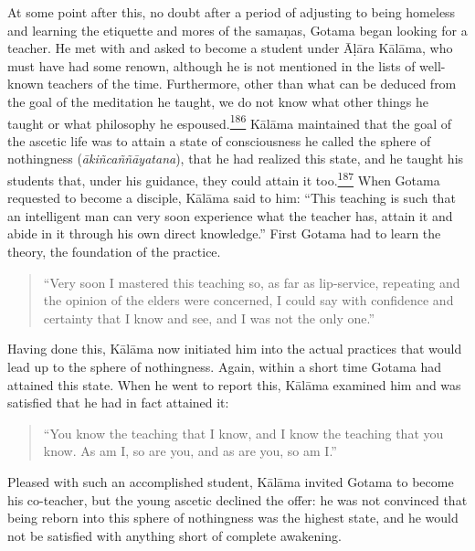 At some point after this, no doubt after a period of adjusting to being
homeless and learning the etiquette and mores of the samaṇas, Gotama
began looking for a teacher. He met with and asked to become a student
under Āḷāra Kālāma, who must have had some renown, although he is not
mentioned in the lists of well-known teachers of the time. Furthermore,
other than what can be deduced from the goal of the meditation he
taught, we do not know what other things he taught or what philosophy he
espoused.\label{footprints_split_009.html_fnref186}\hyperref[footprints_split_024.htmlux5cux23fn186]{\textsuperscript{186}}
Kālāma maintained that the goal of the ascetic life was to attain a
state of consciousness he called the sphere of nothingness
(\emph{ākiñcaññāyatana}), that he had realized this state, and he taught
his students that, under his guidance, they could attain it
too.\label{footprints_split_009.html_fnref187}\hyperref[footprints_split_024.htmlux5cux23fn187]{\textsuperscript{187}}
When Gotama requested to become a disciple, Kālāma said to him: ``This
teaching is such that an intelligent man can very soon experience what
the teacher has, attain it and abide in it through his own direct
knowledge.'' First Gotama had to learn the theory, the foundation of the
practice.

\begin{quote}
``Very soon I mastered this teaching so, as far as lip-service,
repeating and the opinion of the elders were concerned, I could say with
confidence and certainty that I know and see, and I was not the only
one.''
\end{quote}

Having done this, Kālāma now initiated him into the actual practices
that would lead up to the sphere of nothingness. Again, within a short
time Gotama had attained this state. When he went to report this, Kālāma
examined him and was satisfied that he had in fact attained it:

\begin{quote}
``You know the teaching that I know, and I know the teaching that you
know. As am I, so are you, and as are you, so am I.''
\end{quote}

Pleased with such an accomplished student, Kālāma invited Gotama to
become his co-teacher, but the young ascetic declined the offer: he was
not convinced that being reborn into this sphere of nothingness was the
highest state, and he would not be satisfied with anything short of
complete awakening.

